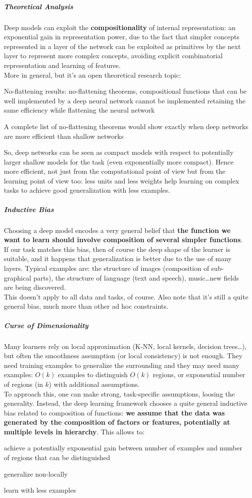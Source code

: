 \documentclass[10pt]{report}
\begin{document}
\subparagraph{Theoretical Analysis} Deep models can exploit the \textbf{compositionality} of internal representation: an exponential gain in representation power, due to the fact that simpler concepts represented in a layer of the network can be exploited as primitives by the next layer to represent more complex concepts, avoiding explicit combinatorial representation and learning of features.\\
More in general, but it's an open theoretical research topic:
\begin{list}{}{}
	\item No-flattening results: no-flattening theorems, compositional functions that can be well implemented by a deep neural network cannot be implemented retaining the same efficiency while flattening the neural network
	\item A complete list of no-flattening theorems would show exactly when deep networks are more efficient than shallow networks
\end{list}
So, deep networks can be seen as compact models with respect to potentially larger shallow models for the task (even exponentially more compact). Hence more efficient, not just from the computational point of view but from the learning point of view too: less units and less weights help learning on complex tasks to achieve good generalization with less examples.
\subparagraph{Inductive Bias} Choosing a deep model encodes a very general belief that \textbf{the function we want to learn should involve composition of several simpler functions}. If our task matches this bias, then of course the deep shape of the learner is suitable, and it happens that generalization is better due to the use of many layers. Typical examples are: the structure of images (composition of sub-graphical parts), the structure of language (text and speech), music\ldots new fields are being discovered.\\
This doesn't apply to all data and tasks, of course. Also note that it's still a quite general bias, much more than other ad hoc constraints.
\subparagraph{Curse of Dimensionality} Many learners rely on local approximation (K-NN, local kernels, decision trees\ldots), but often the smoothness assumption (or local consistency) is not enough. They need training examples to generalize the surrounding and they may need many examples: $O(k)$ examples to distinguish $O(k)$ regions, or exponential number of regions (in $k$) with additional assumptions.\\
To approach this, one can make strong, task-specific assumptions, loosing the generality. Instead, the deep learning framework chooses a quite general inductive bias related to composition of functions: \textbf{we assume that the data was generated by the composition of factors or features, potentially at multiple levels in hierarchy}. This allows to:\begin{list}{}{}
	\item achieve a potentially exponential gain between number of examples and number of regions that can be distinguished
	\item generalize non-locally
	\item learn with less examples
\end{list}
\end{document}
